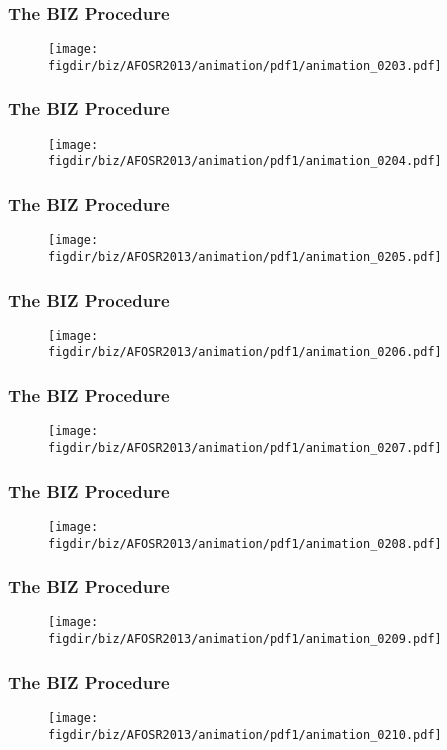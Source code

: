 \documentclass[13pt]{beamer}
\newcommand{\figdir}{../../fig}
\begin{document}
{\begin{frame}\frametitle{The BIZ Procedure}\begin{figure}\texttt{[image: \\figdir/biz/AFOSR2013/animation/pdf1/animation\_0203.pdf]}\end{figure}\end{frame}
\begin{frame}\frametitle{The BIZ Procedure}\begin{figure}\texttt{[image: \\figdir/biz/AFOSR2013/animation/pdf1/animation\_0204.pdf]}\end{figure}\end{frame}
\begin{frame}\frametitle{The BIZ Procedure}\begin{figure}\texttt{[image: \\figdir/biz/AFOSR2013/animation/pdf1/animation\_0205.pdf]}\end{figure}\end{frame}
\begin{frame}\frametitle{The BIZ Procedure}\begin{figure}\texttt{[image: \\figdir/biz/AFOSR2013/animation/pdf1/animation\_0206.pdf]}\end{figure}\end{frame}
\begin{frame}\frametitle{The BIZ Procedure}\begin{figure}\texttt{[image: \\figdir/biz/AFOSR2013/animation/pdf1/animation\_0207.pdf]}\end{figure}\end{frame}
\begin{frame}\frametitle{The BIZ Procedure}\begin{figure}\texttt{[image: \\figdir/biz/AFOSR2013/animation/pdf1/animation\_0208.pdf]}\end{figure}\end{frame}
\begin{frame}\frametitle{The BIZ Procedure}\begin{figure}\texttt{[image: \\figdir/biz/AFOSR2013/animation/pdf1/animation\_0209.pdf]}\end{figure}\end{frame}
\begin{frame}\frametitle{The BIZ Procedure}\begin{figure}\texttt{[image: \\figdir/biz/AFOSR2013/animation/pdf1/animation\_0210.pdf]}\end{figure}\end{frame}
}
\end{document}
